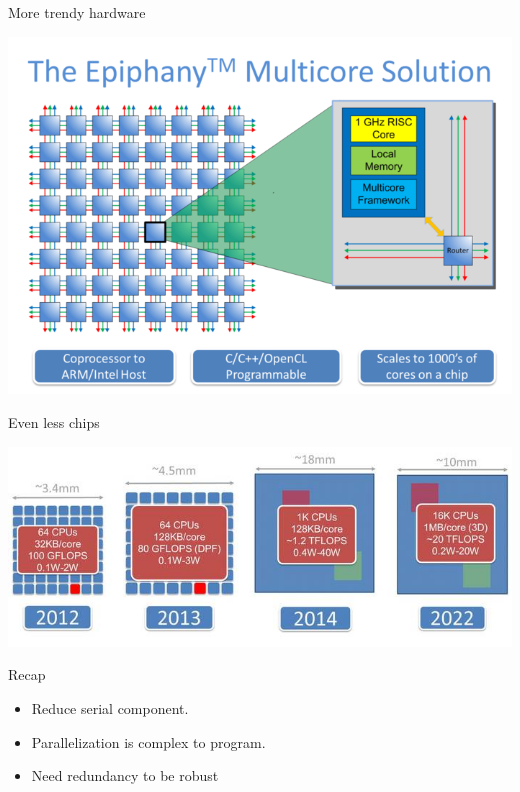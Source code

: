\documentclass[14pt]{beamer}
\begin{document}
\begin{frame}{More trendy hardware}
    \begin{center}
        \includegraphics[height=0.8\textheight]{images/parallella_64core.png}
    \end{center}
\end{frame}

\begin{frame}{Even less chips}
    \begin{center}
        \includegraphics[width=\textheight]{images/parallella_future.jpg}
    \end{center}
\end{frame}

\begin{frame}{Recap}
    \begin{itemize}
        \item Reduce serial component.
        \item Parallelization is complex to program.
            \pause
        \item Need redundancy to be robust
    \end{itemize}
\end{frame}
\end{document}
